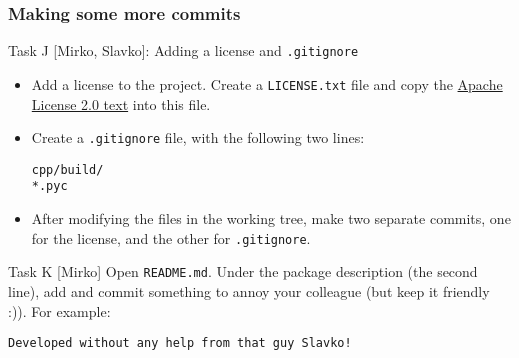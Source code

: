 
\begin{frame}[fragile]

\frametitle{Making some more commits}

\begin{block}{Task J [Mirko, Slavko]: Adding a license and \texttt{.gitignore}}
	\begin{itemize}
	\item Add a license to the project. Create a \texttt{LICENSE.txt} file and copy the \href{https://www.apache.org/licenses/LICENSE-2.0.txt}{Apache License 2.0 text} into this file.
	\item Create a \texttt{.gitignore} file, with the following two lines:
	\begin{verbatim}
cpp/build/
*.pyc
	\end{verbatim}
	\item After modifying the files in the working tree, make two separate commits, one for the license, and the other for \texttt{.gitignore}.
	\end{itemize}
\end{block}

\begin{block}{Task K [Mirko]}
	Open \texttt{README.md}. Under the package description (the second line), add and commit something to annoy your colleague (but keep it friendly :)). For example:
	\begin{verbatim}
Developed without any help from that guy Slavko!
	\end{verbatim}
\end{block}

\end{frame}


